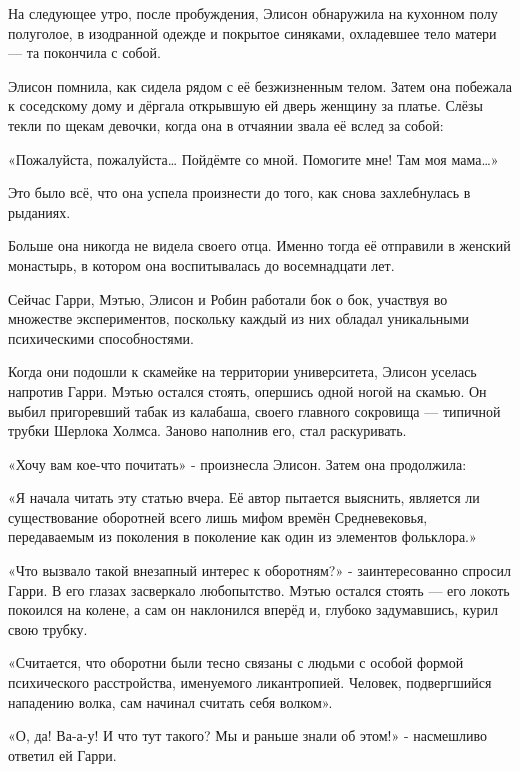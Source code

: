 \documentclass[a4paper,12pt]{book}
\begin{document}
На следующее утро, после пробуждения, Элисон обнаружила на кухонном полу полуголое, в изодранной одежде и покрытое синяками, охладевшее тело матери — та покончила с собой.
\par
Элисон помнила, как сидела рядом с её безжизненным телом. Затем она побежала к соседскому дому и дёргала открывшую ей дверь женщину за платье. Слёзы текли по щекам девочки, когда она в отчаянии звала её вслед за собой:
\par
«Пожалуйста, пожалуйста… Пойдёмте со мной. Помогите мне! Там моя мама…»
\par
Это было всё, что она успела произнести до того, как снова захлебнулась в рыданиях.
\par
Больше она никогда не видела своего отца. Именно тогда её отправили в женский монастырь, в котором она воспитывалась до восемнадцати лет.\\
\par
Сейчас Гарри, Мэтью, Элисон и Робин работали бок о бок, участвуя во множестве экспериментов, поскольку каждый из них обладал уникальными психическими способностями.\\
\par
Когда они подошли к скамейке на территории университета, Элисон уселась напротив Гарри. Мэтью остался стоять, опершись одной ногой на скамью. Он выбил пригоревший табак из калабаша, своего главного сокровища — типичной трубки Шерлока Холмса. Заново наполнив его, стал раскуривать.\\
\par
«Хочу вам кое-что почитать» - произнесла Элисон. Затем она продолжила:
\par
«Я начала читать эту статью вчера. Её автор пытается выяснить, является ли существование оборотней всего лишь мифом времён Средневековья, передаваемым из поколения в поколение как один из элементов фольклора.»\\
\par
«Что вызвало такой внезапный интерес к оборотням?» - заинтересованно спросил Гарри. В его глазах засверкало любопытство. Мэтью остался стоять — его локоть покоился на колене, а сам он наклонился вперёд и, глубоко задумавшись, курил свою трубку.
\par
«Считается, что оборотни были тесно связаны с людьми с особой формой психического расстройства, именуемого ликантропией. Человек, подвергшийся нападению волка, сам начинал считать себя волком».
\par
«О, да! Ва-а-у! И что тут такого? Мы и раньше знали об этом!» - насмешливо ответил ей Гарри.
\end{document}
